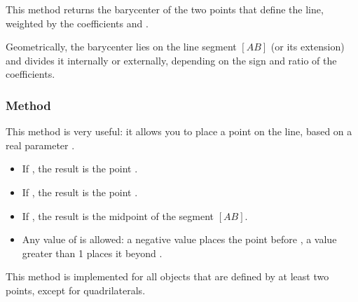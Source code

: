 This method returns the barycenter of the two points that define the line, weighted by the coefficients  and .

\medskip
\noindent
Geometrically, the barycenter lies on the line segment $[AB]$ (or its extension) and divides it internally or externally, depending on the sign and ratio of the coefficients.


\begin{tkzexample}[latex=.5\textwidth]
\begin{center}
\end{center}
\end{tkzexample}

\subsubsection{Method  }%
\label{ssub:method_point}

This method is very useful: it allows you to place a point on the line, based on a real parameter .

\begin{itemize}
  \item If , the result is the point .
  \item If , the result is the point .
  \item If , the result is the midpoint of the segment $[AB]$.
  \item Any value of  is allowed: a negative value places the point before , a value greater than 1 places it beyond .
\end{itemize}

This method is implemented for all objects that are defined by at least two points, except for quadrilaterals.


\begin{minipage}{.5\textwidth}
\begin{center}
\end{center}
\end{minipage}
\begin{minipage}{.5\textwidth}
\begin{tkzexample}
\end{tkzexample}
\end{minipage}

